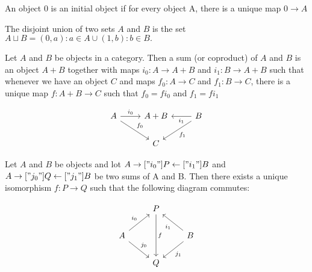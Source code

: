 \begin{definition}
  An object $0$ is an initial object if for every object A, there is a unique
  map $ 0 \rightarrow A $
\end{definition}

\begin{definition}
  The disjoint union of two sets $A$ and $B$ is the set
  $ A \sqcup B = {(0,a):a \in A} \cup {(1,b):b \in B}. $
\end{definition}

\begin{definition}[Coproduct]
  Let $A$ and $B$ be objects in a category.
  Then a sum (or coproduct) of $A$ and $B$ is an object $A + B$
  together with maps $i_0 : A \rightarrow A + B $ and $i_1 : B \rightarrow A + B $
  such that whenever we have an object $C$ and maps
  $f_0 : A \rightarrow C$ and $f_1 : B \rightarrow C$, there is a unique map
  $f : A + B \rightarrow C$ such that $f_0 = fi_0 $ and $f_1 = fi_1$

  \[
  \begin{tikzcd}
  A \arrow[dr, "f_0"] \arrow[r, "i_0"] & A + B & \arrow[l, "i_1"] \arrow[dl, "f_1"] B \\
                                       &   C   & 
  \end{tikzcd}
  \]
  
\end{definition}

\begin{theorem}
  Let $ A $ and $B$ be objects and lot $ A \rightarrow["i_0"] P \leftarrow["i_1"] B $ and
  $ A \rightarrow["j_0"] Q \leftarrow["j_1"] B $ be two sums of A and B.
  Then there exists a unique isomorphism $f:P \rightarrow Q $ such that the following diagram commutes:

  \[
  \begin{tikzcd}
  & P \arrow[dd, "f"] &   \\
  A  \arrow[dr, "j_0"] \arrow[ur, "i_0"]  & & B \arrow[ul, "i_1"] \arrow[dl, "j_1"]\\
  & Q                 &   \\
  \end{tikzcd}
  \]
\end{theorem}
